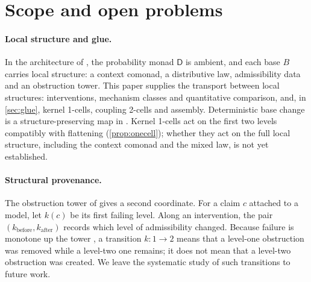 \documentclass[11pt]{article}
\theoremstyle{definition}
\theoremstyle{remark}
\newcommand{\D}{\mathsf{D}}
\begin{document}
\section{Scope and open problems}\label{sec:scope}

\paragraph{Local structure and glue.} In the architecture of \cite{Awasthi-Tower}, the probability monad
$\D$ is ambient, and each base $B$ carries local structure: a context comonad, a distributive law,
admissibility data and an obstruction tower. This paper supplies the transport between local
structures: interventions, mechanism classes and quantitative comparison, and, in \cref{sec:glue},
kernel 1-cells, coupling 2-cells and assembly. Deterministic base change is a structure-preserving map
in \cite[Prop.~9.13]{Awasthi-Tower}. Kernel 1-cells act on the first two levels compatibly with
flattening (\cref{prop:onecell}); whether they act on the full local structure, including the context
comonad and the mixed law, is not yet established.

\paragraph{Structural provenance.} The obstruction tower of \cite[\S10]{Awasthi-Tower} gives a second
coordinate. For a claim $c$ attached to a model, let $k(c)$ be its first failing level. Along an
intervention, the pair $(k_{\mathrm{before}},k_{\mathrm{after}})$ records which level of admissibility
changed. Because failure is monotone up the tower \cite[Thm.~10.5]{Awasthi-Tower}, a transition
$k:1\to2$ means that a level-one obstruction was removed while a level-two one remains; it does not
mean that a level-two obstruction was created. We leave the systematic study of such transitions to
future work.
\end{document}
